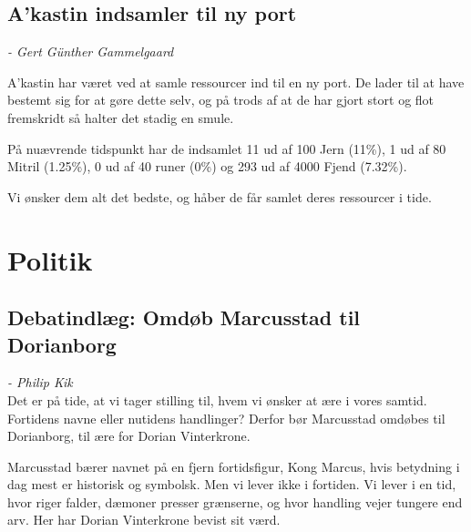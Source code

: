 \documentclass[letterpaper,12pt]{memoir}
\begin{document}
\subsection*{A'kastin indsamler til ny port}
\textit{- Gert Günther Gammelgaard}\\
\newline 
A'kastin har været ved at samle ressourcer ind til en ny port. De lader til at have bestemt sig for at gøre dette selv, og på trods af at de har gjort stort og flot fremskridt så halter det stadig en smule.

På nuævrende tidspunkt har de indsamlet 11 ud af 100 Jern (11\%), 1 ud af 80 Mitril (1.25\%), 0 ud af 40 runer (0\%) og 293 ud af 4000 Fjend (7.32\%). 

Vi ønsker dem alt det bedste, og håber de får samlet deres ressourcer i tide.

\section*{Politik}
\subsection*{Debatindlæg: Omdøb Marcusstad til Dorianborg}
\textit{- Philip Kik}\\

Det er på tide, at vi tager stilling til, hvem vi ønsker at ære i vores samtid. Fortidens navne eller nutidens handlinger? Derfor bør Marcusstad omdøbes til Dorianborg, til ære for Dorian Vinterkrone.

Marcusstad bærer navnet på en fjern fortidsfigur, Kong Marcus, hvis betydning i dag mest er historisk og symbolsk. Men vi lever ikke i fortiden. Vi lever i en tid, hvor riger falder, dæmoner presser grænserne, og hvor handling vejer tungere end arv. Her har Dorian Vinterkrone bevist sit værd.
\end{document}

